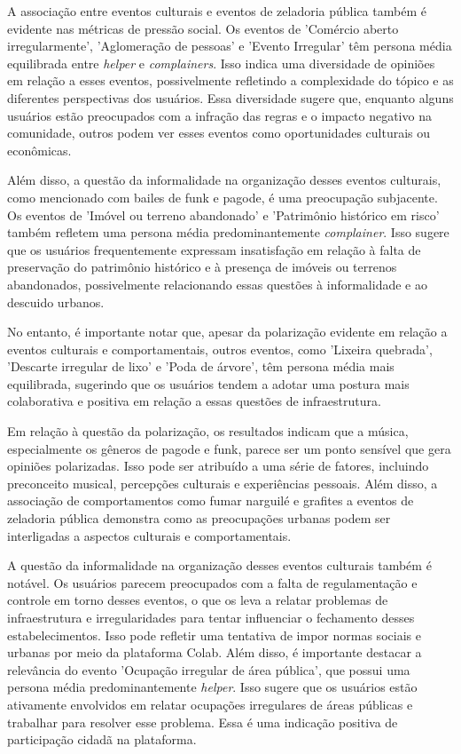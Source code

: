 A associação entre eventos culturais e eventos de zeladoria pública também é evidente nas métricas de pressão social. Os eventos de 'Comércio aberto irregularmente', 'Aglomeração de pessoas' e 'Evento Irregular' têm persona média equilibrada entre \textit{helper} e \textit{complainers}. Isso indica uma diversidade de opiniões em relação a esses eventos, possivelmente refletindo a complexidade do tópico e as diferentes perspectivas dos usuários. Essa diversidade sugere que, enquanto alguns usuários estão preocupados com a infração das regras e o impacto negativo na comunidade, outros podem ver esses eventos como oportunidades culturais ou econômicas.

Além disso, a questão da informalidade na organização desses eventos culturais, como mencionado com bailes de funk e pagode, é uma preocupação subjacente. Os eventos de 'Imóvel ou terreno abandonado' e 'Patrimônio histórico em risco' também refletem uma persona média predominantemente \textit{complainer}. Isso sugere que os usuários frequentemente expressam insatisfação em relação à falta de preservação do patrimônio histórico e à presença de imóveis ou terrenos abandonados, possivelmente relacionando essas questões à informalidade e ao descuido urbanos.

No entanto, é importante notar que, apesar da polarização evidente em relação a eventos culturais e comportamentais, outros eventos, como 'Lixeira quebrada', 'Descarte irregular de lixo' e 'Poda de árvore', têm persona média mais equilibrada, sugerindo que os usuários tendem a adotar uma postura mais colaborativa e positiva em relação a essas questões de infraestrutura.

Em relação à questão da polarização, os resultados indicam que a música, especialmente os gêneros de pagode e funk, parece ser um ponto sensível que gera opiniões polarizadas. Isso pode ser atribuído a uma série de fatores, incluindo preconceito musical, percepções culturais e experiências pessoais. Além disso, a associação de comportamentos como fumar narguilé e grafites a eventos de zeladoria pública demonstra como as preocupações urbanas podem ser interligadas a aspectos culturais e comportamentais.

A questão da informalidade na organização desses eventos culturais também é notável. Os usuários parecem preocupados com a falta de regulamentação e controle em torno desses eventos, o que os leva a relatar problemas de infraestrutura e irregularidades para tentar influenciar o fechamento desses estabelecimentos. Isso pode refletir uma tentativa de impor normas sociais e urbanas por meio da plataforma Colab. Além disso, é importante destacar a relevância do evento 'Ocupação irregular de área pública', que possui uma persona média predominantemente \textit{helper}. Isso sugere que os usuários estão ativamente envolvidos em relatar ocupações irregulares de áreas públicas e trabalhar para resolver esse problema. Essa é uma indicação positiva de participação cidadã na plataforma.

